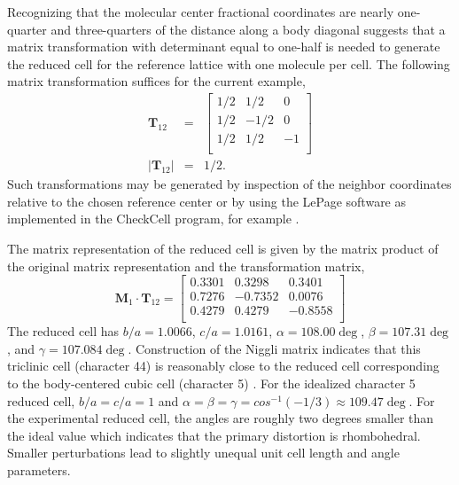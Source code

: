 \documentclass[preprint]{iucr}              %
\begin{document}
Recognizing that the molecular center fractional coordinates are nearly one-quarter and three-quarters of the distance along a body diagonal suggests that a matrix transformation with determinant equal to one-half is needed to generate the reduced cell for the reference lattice with one molecule per cell.  The following matrix transformation suffices for the current example,
\begin{eqnarray}
   \mathbf{T}_{12}&=&\left[
     \begin{array}{ccc}
        1/2& 1/2& 0\\
        1/2& -1/2& 0\\
        1/2& 1/2& -1\\
     \end{array}
  \right]\\
   \vert\mathbf{T}_{12}\vert&=&1/2.
\end{eqnarray}
Such transformations may be generated by inspection of the neighbor coordinates relative to the chosen reference center or by using the LePage software as implemented in the CheckCell program, for example \cite{CheckCell04}.

The matrix representation of the reduced cell is given by the matrix product of the original matrix representation and the transformation matrix,
\begin{equation}
\mathbf{M}_{1}\cdot\mathbf{T}_{12}=\left[
     \begin{array}{ccc}
        0.3301& 0.3298& 0.3401\\
        0.7276& -0.7352& 0.0076\\
        0.4279& 0.4279& -0.8558\\
     \end{array}
  \right]
\end{equation}
The reduced cell has $b/a=1.0066$, $c/a=1.0161$, $\alpha=108.00\deg$, $\beta=107.31\deg$, and $\gamma=107.084\deg$.  Construction of the Niggli matrix indicates that this triclinic cell (character 44) is reasonably close to the reduced cell corresponding to the body-centered cubic cell (character 5) \cite{Hahn02VolASec9.2}.  For the idealized character 5 reduced cell, $b/a=c/a=1$ and $\alpha=\beta=\gamma=cos^{-1}(-1/3)\approx 109.47\deg$.  For the experimental reduced cell, the angles are roughly two degrees smaller than the ideal value which indicates that the primary distortion is rhombohedral.  Smaller perturbations lead to slightly unequal unit cell length and angle parameters.
\end{document}
